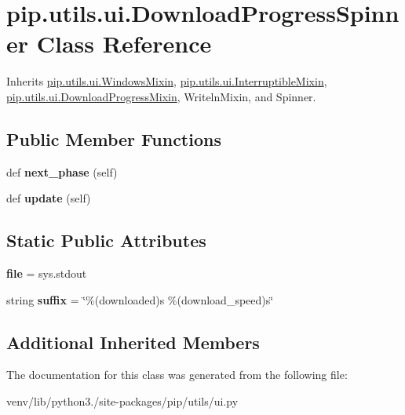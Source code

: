 \hypertarget{classpip_1_1utils_1_1ui_1_1_download_progress_spinner}{}\section{pip.\+utils.\+ui.\+Download\+Progress\+Spinner Class Reference}
\label{classpip_1_1utils_1_1ui_1_1_download_progress_spinner}


Inherits \hyperlink{classpip_1_1utils_1_1ui_1_1_windows_mixin}{pip.\+utils.\+ui.\+Windows\+Mixin}, \hyperlink{classpip_1_1utils_1_1ui_1_1_interruptible_mixin}{pip.\+utils.\+ui.\+Interruptible\+Mixin}, \hyperlink{classpip_1_1utils_1_1ui_1_1_download_progress_mixin}{pip.\+utils.\+ui.\+Download\+Progress\+Mixin}, Writeln\+Mixin, and Spinner.

\subsection*{Public Member Functions}
\begin{DoxyCompactItemize}
\item 
\mbox{\label{classpip_1_1utils_1_1ui_1_1_download_progress_spinner_a9a0cb365508d92f2f5f9e843862c1c49}} 
def {\bfseries next\+\_\+phase} (self)
\item 
\mbox{\label{classpip_1_1utils_1_1ui_1_1_download_progress_spinner_a14470e9acd4f5129e6c425bf75c9d05f}} 
def {\bfseries update} (self)
\end{DoxyCompactItemize}
\subsection*{Static Public Attributes}
\begin{DoxyCompactItemize}
\item 
\mbox{\label{classpip_1_1utils_1_1ui_1_1_download_progress_spinner_ace12e3b968796b5beebaa992e7217a02}} 
{\bfseries file} = sys.\+stdout
\item 
\mbox{\label{classpip_1_1utils_1_1ui_1_1_download_progress_spinner_a2c3b19533c3865bbc4e16d66da65e83f}} 
string {\bfseries suffix} = \char`\"{}\%(downloaded)s \%(download\+\_\+speed)s\char`\"{}
\end{DoxyCompactItemize}
\subsection*{Additional Inherited Members}


The documentation for this class was generated from the following file\+:\begin{DoxyCompactItemize}
\item 
venv/lib/python3./site-\/packages/pip/utils/ui.\+py\end{DoxyCompactItemize}
